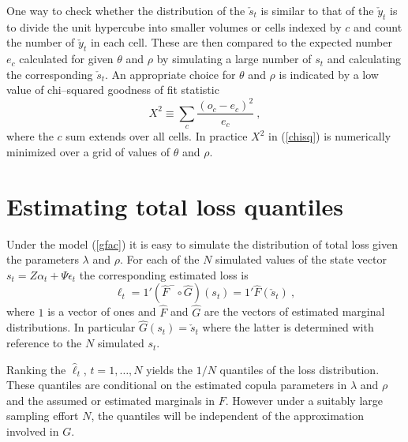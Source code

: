 \documentclass[a4paper,12pt]{article}
\newcommand{\eps}{\epsilon}
\newcommand{\eref}[1]{(\ref{#1})}
\begin{document}
One way to check whether the distribution of the $\check s_t$ is similar to that of the $\check y_t$ is to divide the unit hypercube into smaller volumes or cells indexed by $c$ and count the number of $\check y_t$ in each cell.   These are then compared to the expected number $e_c$ calculated for given $\theta$ and $\rho$ by simulating a large number of $s_t$ and calculating the corresponding $\check s_t$.  An appropriate choice for $\theta$ and $\rho$ is indicated by a low value of chi--squared goodness of fit statistic
\begin{equation}\label{chisq}
X^2\equiv \sum_c \frac{(o_c-e_c)^2}{e_c}\ ,
\end{equation}
where the $c$ sum extends over all cells.  In practice $X^2$ in  \eref{chisq} is numerically minimized  over a grid of values of $\theta$ and $\rho$.

\section{Estimating total loss quantiles}

Under the model \eref{gfac} it is easy to simulate the distribution of total loss given the parameters $\lambda$ and $\rho$.   For each of the $N$ simulated values of the state vector $s_t=Z\alpha_t+\Psi\eps_t$ the corresponding estimated loss is
$$
\ell_t = 1'(\hat F^-\circ \hat G)(s_t)=1'\hat F(\check s_t)\ ,
$$
where $1$ is a vector of ones and $\hat F$ and $\hat G$ are the vectors of estimated marginal distributions.   In particular $\hat G(s_t)=\check s_t$ where the latter is determined with reference to the $N$ simulated $s_t$.

Ranking the $\hat\ell_t$, $t=1,\ldots,N$ yields the $1/N$ quantiles of the loss distribution.   These quantiles are conditional on the estimated copula parameters in $\lambda$ and $\rho$ and the assumed or estimated marginals in $F$.  However under a suitably large sampling effort $N$, the quantiles will be independent of the approximation involved in $G$.
\end{document}
